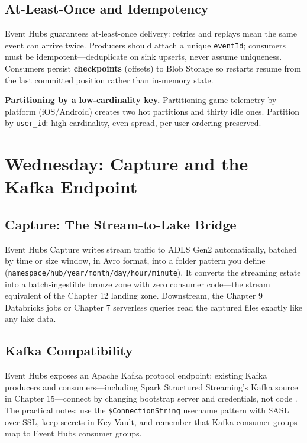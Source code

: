 \subsection{At-Least-Once and Idempotency}
Event Hubs guarantees at-least-once delivery: retries and replays mean the same event can arrive twice. Producers should attach a unique \texttt{eventId}; consumers must be idempotent---deduplicate on sink upserts, never assume uniqueness. Consumers persist \textbf{checkpoints} (offsets) to Blob Storage so restarts resume from the last committed position rather than in-memory state.

\begin{pitfall}
\textbf{Partitioning by a low-cardinality key.} Partitioning game telemetry by platform (iOS/Android) creates two hot partitions and thirty idle ones. Partition by \texttt{user\_id}: high cardinality, even spread, per-user ordering preserved.
\end{pitfall}

\section{Wednesday: Capture and the Kafka Endpoint}

\subsection{Capture: The Stream-to-Lake Bridge}
Event Hubs Capture writes stream traffic to ADLS Gen2 automatically, batched by time or size window, in Avro format, into a folder pattern you define (\texttt{namespace/hub/year/month/day/hour/minute}). It converts the streaming estate into a batch-ingestible bronze zone with zero consumer code---the stream equivalent of the Chapter 12 landing zone. Downstream, the Chapter 9 Databricks jobs or Chapter 7 serverless queries read the captured files exactly like any lake data.

\subsection{Kafka Compatibility}
Event Hubs exposes an Apache Kafka protocol endpoint: existing Kafka producers and consumers---including Spark Structured Streaming's Kafka source in Chapter 15---connect by changing bootstrap server and credentials, not code \cite{apache2025kafka}. The practical notes: use the \texttt{\$ConnectionString} username pattern with SASL over SSL, keep secrets in Key Vault, and remember that Kafka consumer groups map to Event Hubs consumer groups.


